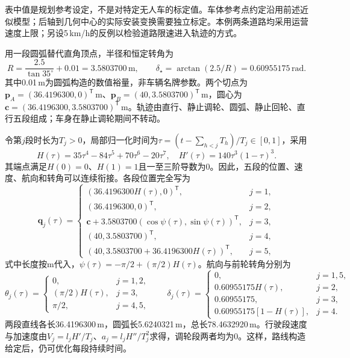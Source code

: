 表中值是规划参考设定，不是对特定无人车的标定值。车体参考点约定沿用前述近似模型；后轴到几何中心的实际安装变换需要独立标定\cite{LaValle2006}。本例两条道路均采用运营速度上限；另设5\,km/h的反例以检验道路限速进入轨迹的方式。

用一段圆弧替代直角顶点，半径和恒定转角为
\begin{equation}
 R=\frac{2.5}{\tan35^{\circ}}+0.01=3.5803700\,\mathrm m,
 \qquad \delta_\star=\arctan(2.5/R)=0.60955175\,\mathrm{rad}.
\end{equation}
其中0.01\,m为圆弧构造的数值裕量，非车辆名牌参数。两个切点为$\mathbf p_A=(36.4196300,0)^{\mathsf T}\,\mathrm m$、$\mathbf p_B=(40,3.5803700)^{\mathsf T}\,\mathrm m$，圆心为$\mathbf c=(36.4196300,3.5803700)^{\mathsf T}\,\mathrm m$。轨迹由直行、静止调轮、圆弧、静止回轮、直行五段组成；车身在静止调轮期间不转动。

令第$j$段时长为$T_j>0$，局部归一化时间为$\tau=(t-\sum_{h<j}T_h)/T_j\in[0,1]$，采用
\begin{equation}
 H(\tau)=35\tau^4-84\tau^5+70\tau^6-20\tau^7,
 \quad H'(\tau)=140\tau^3(1-\tau)^3.
 \label{s0407:septic_progress}
\end{equation}
其端点满足$H(0)=0$、$H(1)=1$且一至三阶导数为0。因此，五段的位置、速度、航向和转角可以连续衔接。各段位置完全写为
\begin{equation}
 \mathbf q_j(\tau)=
 \begin{cases}
 (36.4196300H(\tau),0)^{\mathsf T},&j=1,\\
 (36.4196300,0)^{\mathsf T},&j=2,\\
 \mathbf c+3.5803700(\cos\psi(\tau),\sin\psi(\tau))^{\mathsf T},&j=3,\\
 (40,3.5803700)^{\mathsf T},&j=4,\\
 (40,3.5803700+36.4196300H(\tau))^{\mathsf T},&j=5,
 \end{cases}
 \label{s0407:full_numeric_path}
\end{equation}
式中长度按$\mathrm m$代入，$\psi(\tau)=-\pi/2+(\pi/2)H(\tau)$。航向与前轮转角分别为
\begin{equation}
 \theta_j(\tau)=
 \begin{cases}
 0,&j=1,2,\\
 (\pi/2)H(\tau),&j=3,\\
 \pi/2,&j=4,5,
 \end{cases}
 \qquad
 \delta_j(\tau)=
 \begin{cases}
 0,&j=1,5,\\
 0.60955175H(\tau),&j=2,\\
 0.60955175,&j=3,\\
 0.60955175[1-H(\tau)],&j=4.
 \end{cases}
\end{equation}
两段直线各长36.4196300\,m，圆弧长5.6240321\,m，总长78.4632920\,m。行驶段速度与加速度由$V_j=l_jH'/T_j$、$a_j=l_jH''/T_j^2$求得，调轮段两者均为0。这样，路线构造给定后，仍可优化每段持续时间。

